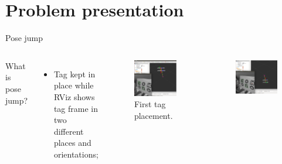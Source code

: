 \documentclass[10pt]{beamer}
\begin{document}

\section{Problem presentation}


\begin{frame}[fragile]{Pose jump}

  \begin{columns}
      What is pose jump?
      \begin{itemize}
        \item Tag kept in place while RViz shows tag frame in two different places and orientations;
      \end{itemize}
      \begin{figure}
        \includegraphics[scale=0.15]{pj01}
        \caption{First tag placement.}
      \end{figure}
      \begin{figure}
        \includegraphics[scale=0.15]{pj02}

\end{figure}
\end{columns}
\end{frame}
\end{document}
